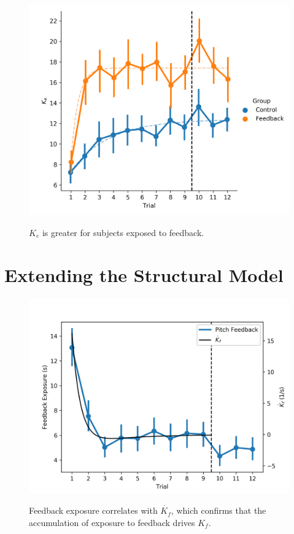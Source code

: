 \begin{figure}[t]
    \centering
    \centering
    \includegraphics[width=0.8\linewidth]{figures/Modeling/ke_group.png}
    \label{fig:ke_group}
    \caption[$K_e$ is greater for subjects exposed to feedback]{$K_e$ is greater for subjects exposed to feedback.}
\end{figure}

\section{Extending the Structural Model}

\begin{figure}[t]
    \centering
    \centering
    \includegraphics[width=0.8\linewidth]{figures/Modeling/f_v_kfd.png}
    \label{fig:feedback_kfd}
    \caption[Feedback exposure correlates with $\dot{K_f}$]{Feedback exposure correlates with $\dot{K_f}$, which confirms that the accumulation of exposure to feedback drives $K_f$.}
\end{figure}

